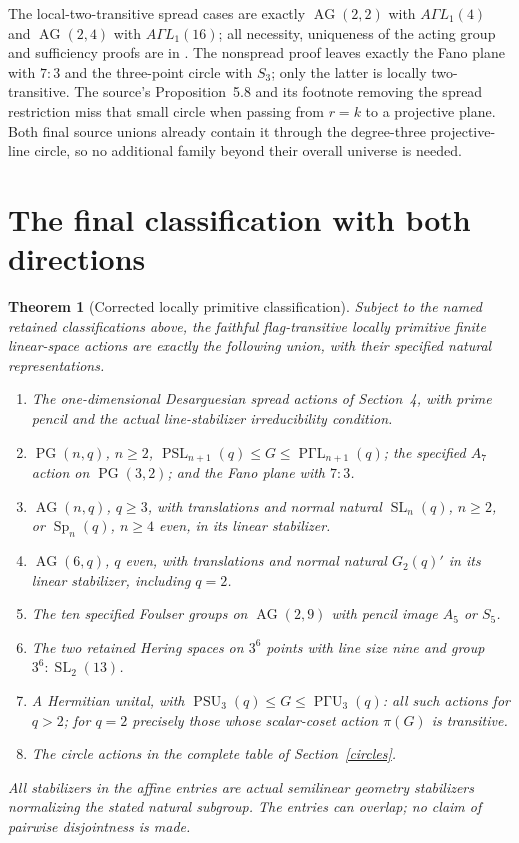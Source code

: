 \documentclass[11pt,a4paper]{article}
\newtheorem{theorem}{Theorem}[section]
\begin{document}
The local-two-transitive spread cases are exactly
$\operatorname{AG}(2,2)$ with $A\Gamma L_1(4)$ and
$\operatorname{AG}(2,4)$ with $A\Gamma L_1(16)$; all necessity,
uniqueness of the acting group and sufficiency proofs are in
\cite[Proposition~\ref{U-onedim2t}]{U}. The nonspread proof
\cite[Proposition~\ref{U-nonspread}]{U} leaves exactly the Fano
plane with $7:3$ and the three-point circle with $S_3$; only the
latter is locally two-transitive. The source's Proposition~5.8 and
its footnote removing the spread restriction miss that small circle
when passing from $r=k$ to a projective plane. Both final source
unions already contain it through the degree-three projective-line
circle, so no additional family beyond their overall universe is needed.

\section{The final classification with both directions}
\begin{theorem}[Corrected locally primitive classification]\label{finalprime}
Subject to the named retained classifications above, the faithful
flag-transitive locally primitive finite linear-space actions are
exactly the following union, with their specified natural representations.
\begin{enumerate}
\item The one-dimensional Desarguesian spread actions of Section~4,
with prime pencil and the actual line-stabilizer irreducibility condition.
\item $\operatorname{PG}(n,q)$, $n\geq2$,
$\operatorname{PSL}_{n+1}(q)\leq G\leq\operatorname{P\Gamma L}_{n+1}(q)$;
the specified $A_7$ action on $\operatorname{PG}(3,2)$; and the Fano
plane with $7:3$.
\item $\operatorname{AG}(n,q)$, $q\geq3$, with translations and
normal natural $\operatorname{SL}_n(q)$, $n\geq2$, or
$\operatorname{Sp}_n(q)$, $n\geq4$ even, in its linear stabilizer.
\item $\operatorname{AG}(6,q)$, $q$ even, with translations and
normal natural $G_2(q)'$ in its linear stabilizer, including $q=2$.
\item The ten specified Foulser groups on $\operatorname{AG}(2,9)$
with pencil image $A_5$ or $S_5$.
\item The two retained Hering spaces on $3^6$ points with line size
nine and group $3^6:\operatorname{SL}_2(13)$.
\item A Hermitian unital, with
$\operatorname{PSU}_3(q)\leq G\leq\operatorname{P\Gamma U}_3(q)$:
all such actions for $q>2$; for $q=2$ precisely those whose scalar-coset
action $\pi(G)$ is transitive.
\item The circle actions in the complete table of Section~\ref{circles}.
\end{enumerate}
All stabilizers in the affine entries are actual semilinear geometry
stabilizers normalizing the stated natural subgroup. The entries can
overlap; no claim of pairwise disjointness is made.
\end{theorem}
\end{document}
